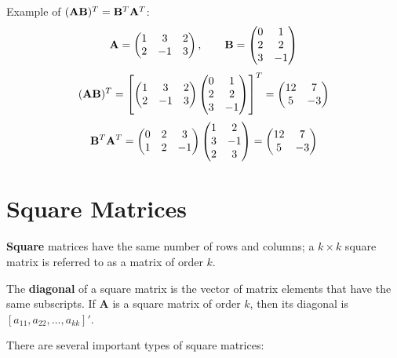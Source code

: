 \documentclass[]{book}
\theoremstyle{definition}
\theoremstyle{definition}
\theoremstyle{definition}
\theoremstyle{remark}
\begin{document}
Example of \(({\bf AB})^T = {\bf B}^T{\bf A}^T\):
\[{\bf A}=\begin{pmatrix} 1&3&2\\2&-1&3\end{pmatrix}, \qquad {\bf B}=\begin{pmatrix} 0&1\\2&2\\3&-1\end{pmatrix}\]
\[ ({\bf AB})^T = \left[ \begin{pmatrix} 1&3&2\\2&-1&3\end{pmatrix} \begin{pmatrix} 0&1\\2&2\\3&-1\end{pmatrix} \right]^T = \begin{pmatrix} 12&7\\5&-3 \end{pmatrix}\]
\[ {\bf B}^T{\bf A}^T= \begin{pmatrix} 0&2&3\\1&2&-1 \end{pmatrix}  \begin{pmatrix} 1&2\\3&-1\\2&3 \end{pmatrix} = \begin{pmatrix} 12&7\\5&-3 \end{pmatrix}\]

\section{Square Matrices}\label{square-matrices}

\textbf{Square} matrices have the same number of rows and columns; a
\(k \times k\) square matrix is referred to as a matrix of order \(k\).

The \textbf{diagonal} of a square matrix is the vector of matrix
elements that have the same subscripts. If \textbf{A} is a square matrix
of order \(k\), then its diagonal is
\([ a_{11}, a_{22}, \dots, a_{kk}]'\).

There are several important types of square matrices:
\end{document}
